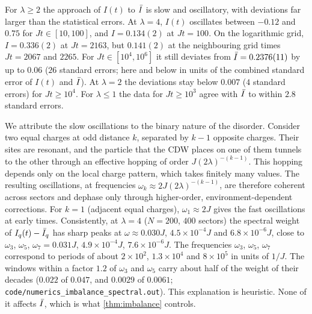 \begin{remark}\label{rem:num-oscillations}
For $\lambda\ge2$ the approach of $I(t)$ to $\bar I$ is slow and oscillatory, with deviations far larger than the
statistical errors.  At $\lambda=4$, $I(t)$ oscillates between $-0.12$ and $0.75$ for $Jt\in[10,100]$, and
$I=0.134(2)$ at $Jt=100$.  On the logarithmic grid, $I=0.336(2)$ at $Jt=2163$, but $0.141(2)$ at the neighbouring
grid times $Jt=2067$ and $2265$.  For $Jt\in[10^4,10^6]$ it still deviates from $\bar I=0.2376(11)$ by up to $0.06$
($26$ standard errors; here and below in units of the combined standard error of $I(t)$ and $\bar I$).  At $\lambda=2$
the deviations stay below $0.007$ ($4$ standard errors) for $Jt\ge10^4$.  For $\lambda\le1$ the data for $Jt\ge10^3$
agree with $\bar I$ to within $2.8$ standard errors.

We attribute the slow oscillations to the binary nature of the disorder.  Consider two equal charges at odd
distance $k$, separated by $k-1$ opposite charges.  Their sites are resonant, and the particle that the CDW places
on one of them tunnels to the other through an effective hopping of order $J(2\lambda)^{-(k-1)}$.  This hopping
depends only on the local charge pattern, which takes finitely many values.  The resulting oscillations, at
frequencies $\omega_k\approx2J(2\lambda)^{-(k-1)}$, are therefore coherent across sectors and dephase only through
higher-order, environment-dependent corrections.  For $k=1$ (adjacent equal charges), $\omega_1\approx2J$ gives the
fast oscillations at early times.  Consistently, at $\lambda=4$ ($N=200$, $400$ sectors) the spectral weight of
$I_q(t)-\bar I_q$ has sharp peaks at $\omega\approx0.030J$, $4.5\times10^{-4}J$ and $6.8\times10^{-6}J$, close to
$\omega_3$, $\omega_5$, $\omega_7=0.031J$, $4.9\times10^{-4}J$, $7.6\times10^{-6}J$.  The frequencies $\omega_3$,
$\omega_5$, $\omega_7$ correspond to periods of about $2\times10^2$, $1.3\times10^4$ and $8\times10^5$ in units of $1/J$.  The windows within a factor $1.2$ of $\omega_3$
and $\omega_5$ carry about half of the weight of their decades ($0.022$ of $0.047$, and $0.0029$ of $0.0061$;
\texttt{code/numerics\_imbalance\_spectral.out}).  This explanation is heuristic.  None of it affects $\bar I$,
which is what \cref{thm:imbalance} controls.
\end{remark}

